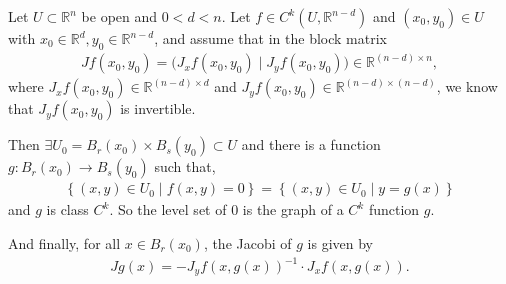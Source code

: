 \begin{theorem}\label{thm:impl-func-theorem}
	Let $U \subset \mathbb{R}^{n}$ be open and $0 < d < n$. Let $f \in C^{k}(U, \mathbb{R}^{n-d})$ and $(x_{0}, y_{0}) \in U$ with $x_{0} \in \mathbb{R}^{d}, y_{0} \in \mathbb{R}^{n-d}$, and assume that in the block matrix
	\begin{align*}
		Jf(x_{0}, y_{0}) = \Big(J_{x}f(x_{0}, y_{0}) \mid J_{y}f(x_{0},y_{0})\Big) \in \mathbb{R}^{(n-d) \times n},
	\end{align*}
	where $J_{x}f(x_{0}, y_{0}) \in \mathbb{R}^{(n-d) \times d}$ and $J_{y}f(x_{0}, y_{0}) \in \mathbb{R}^{(n-d) \times (n-d)}$, we know that $J_{y}f(x_{0}, y_{0})$ is invertible.

	Then $\exists U_{0} = B_{r}(x_{0}) \times B_{s}(y_{0}) \subset U$ and there is a function $g: B_{r}(x_{0}) \to B_{s}(y_{0})$ such that,
	\begin{align*}
		\left\{ (x,y) \in U_{0} \mid f(x,y) = 0 \right\} = \left\{ (x,y) \in U_{0} \mid y = g(x) \right\}
	\end{align*}
	and $g$ is class $C^{k}$. So the level set of $0$ is the graph of a $C^{k}$ function $g$.

	And finally, for all $x \in B_{r}(x_{0})$, the Jacobi of $g$ is given by
	\begin{align*}
		Jg(x) = -J_{y}f(x, g(x))^{-1} \cdot J_{x}f(x, g(x)).
	\end{align*}
\end{theorem}
